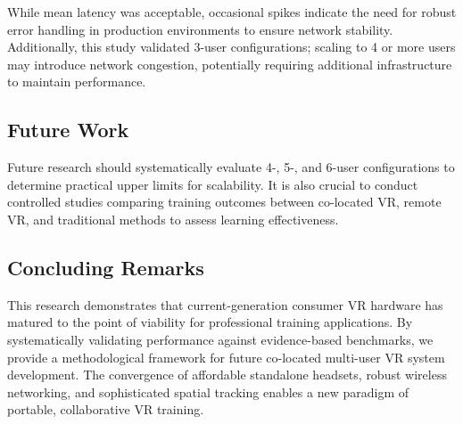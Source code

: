 While mean latency was acceptable, occasional spikes indicate the need for robust error handling in production environments to ensure network stability. Additionally, this study validated 3-user configurations; scaling to 4 or more users may introduce network congestion, potentially requiring additional infrastructure to maintain performance.

\subsection{Future Work}

Future research should systematically evaluate 4-, 5-, and 6-user configurations to determine practical upper limits for scalability. It is also crucial to conduct controlled studies comparing training outcomes between co-located VR, remote VR, and traditional methods to assess learning effectiveness.

\subsection{Concluding Remarks}

This research demonstrates that current-generation consumer VR hardware has matured to the point of viability for professional training applications. By systematically validating performance against evidence-based benchmarks, we provide a methodological framework for future co-located multi-user VR system development. The convergence of affordable standalone headsets, robust wireless networking, and sophisticated spatial tracking enables a new paradigm of portable, collaborative VR training.

